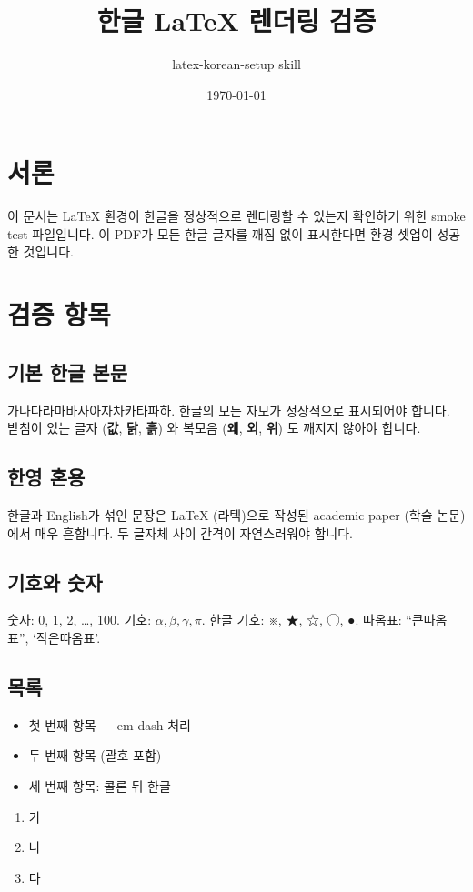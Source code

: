 \documentclass[11pt]{article}
\title{한글 LaTeX 렌더링 검증}
\author{latex-korean-setup skill}
\date{\today}
\begin{document}
\maketitle

\section{서론}
이 문서는 LaTeX 환경이 한글을 정상적으로 렌더링할 수 있는지 확인하기 위한
smoke test 파일입니다. 이 PDF가 모든 한글 글자를 깨짐 없이 표시한다면
환경 셋업이 성공한 것입니다.

\section{검증 항목}

\subsection{기본 한글 본문}
가나다라마바사아자차카타파하. 한글의 모든 자모가 정상적으로 표시되어야 합니다.
받침이 있는 글자 (\textbf{값}, \textbf{닭}, \textbf{흙}) 와 복모음 (\textbf{왜},
\textbf{외}, \textbf{위}) 도 깨지지 않아야 합니다.

\subsection{한영 혼용}
한글과 English가 섞인 문장은 LaTeX (라텍)으로 작성된 academic paper
(학술 논문) 에서 매우 흔합니다. 두 글자체 사이 간격이 자연스러워야 합니다.

\subsection{기호와 숫자}
숫자: 0, 1, 2, \ldots, 100. 기호: $\alpha, \beta, \gamma, \pi$. 한글 기호:
※, ★, ☆, ◯, ●. 따옴표: ``큰따옴표'', `작은따옴표'.

\subsection{목록}
\begin{itemize}
  \item 첫 번째 항목 — em dash 처리
  \item 두 번째 항목 (괄호 포함)
  \item 세 번째 항목: 콜론 뒤 한글
\end{itemize}

\begin{enumerate}
  \item 가
  \item 나
  \item 다
\end{enumerate}
\end{document}
